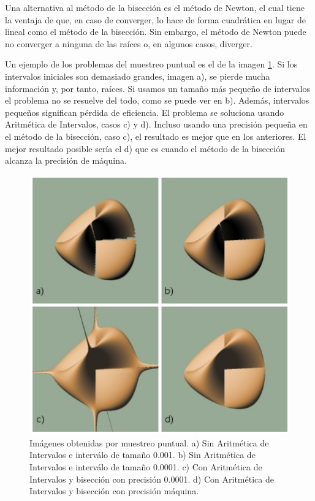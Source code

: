 Una alternativa al método de la bisección es el método de Newton, el cual tiene la ventaja de que, en caso de converger, lo hace de forma cuadrática en lugar de lineal como el método de la bisección. Sin embargo, el método de Newton puede no converger a ninguna de las raíces o, en algunos casos, diverger.\cite{Hart01}

\par Un ejemplo de los problemas del muestreo puntual es el de la imagen \ref{florez45}. Si los intervalos iniciales son demasiado grandes, imagen a), se pierde mucha información y, por tanto, raíces. Si usamos un tamaño más pequeño de intervalos el problema no se resuelve del todo, como se puede ver en b). Además, intervalos pequeños significan pérdida de eficiencia. El problema se soluciona usando Aritmética de Intervalos, casos c) y d). Incluso usando una precisión pequeña en el método de la bisección, caso c), el resultado es mejor que en los anteriores. El mejor resultado posible sería el d) que es cuando el método de la bisección alcanza la precisión de máquina.

\begin{figure}[h]
	\centering
	\includegraphics[scale=0.5]{images/florez5.png}
	\caption{Imágenes obtenidas por muestreo puntual. a) Sin Aritmética de Intervalos e interválo de tamaño 0.001. b) Sin Aritmética de Intervalos e interválo de tamaño 0.0001. c) Con Aritmética de Intervalos y bisección con precisión 0.0001. d) Con Aritmética de Intervalos y bisección con precisión máquina.}
	\label{florez45}
\end{figure}

